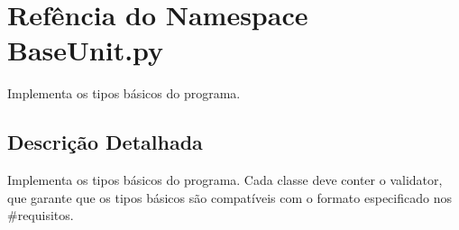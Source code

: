 \hypertarget{namespaceBaseUnit_1_1py}{\section{Refência do Namespace Base\-Unit.\-py}
\label{namespaceBaseUnit_1_1py}
}


Implementa os tipos básicos do programa.  




\subsection{Descrição Detalhada}
Implementa os tipos básicos do programa. Cada classe deve conter o validator, que garante que os tipos básicos são compatíveis com o formato especificado nos \#requisitos. 